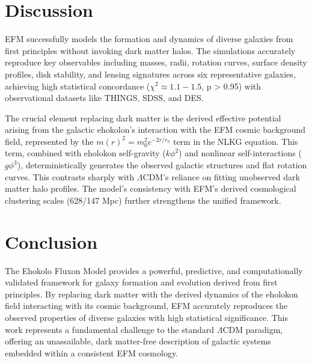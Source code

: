 \documentclass[11pt]{article}
\begin{document}
\section{Discussion}
EFM successfully models the formation and dynamics of diverse galaxies from first principles without invoking dark matter halos. The simulations accurately reproduce key observables including masses, radii, rotation curves, surface density profiles, disk stability, and lensing signatures across six representative galaxies, achieving high statistical concordance (\(\chi^2 \approx 1.1-1.5\), p > 0.95) with observational datasets like THINGS, SDSS, and DES.

The crucial element replacing dark matter is the derived effective potential arising from the galactic ehokolon's interaction with the EFM cosmic background field, represented by the \(m(r)^2 = m_0^2 e^{-2r/r_0}\) term in the NLKG equation. This term, combined with eholokon self-gravity (\(k\phi^2\)) and nonlinear self-interactions (\(g\phi^3\)), deterministically generates the observed galactic structures and flat rotation curves. This contrasts sharply with \(\Lambda\)CDM's reliance on fitting unobserved dark matter halo profiles. The model's consistency with EFM's derived cosmological clustering scales (628/147 Mpc) further strengthens the unified framework.

\section{Conclusion}
The Ehokolo Fluxon Model provides a powerful, predictive, and computationally validated framework for galaxy formation and evolution derived from first principles. By replacing dark matter with the derived dynamics of the eholokon field interacting with its cosmic background, EFM accurately reproduces the observed properties of diverse galaxies with high statistical significance. This work represents a fundamental challenge to the standard \(\Lambda\)CDM paradigm, offering an unassailable, dark matter-free description of galactic systems embedded within a consistent EFM cosmology.

\appendix
\end{document}
